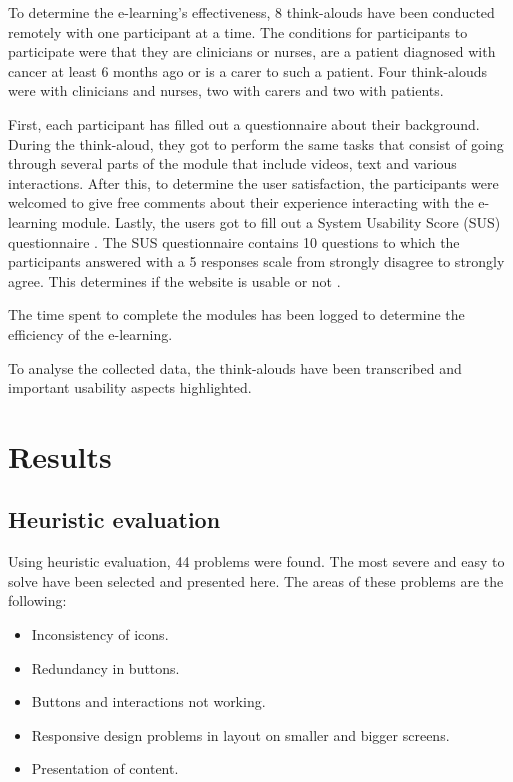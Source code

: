 \documentclass{sigchi}
\begin{document}
To determine the e-learning's effectiveness, 8 think-alouds have been conducted remotely with one participant at a time. The conditions for participants to participate were that they are clinicians or nurses, are a patient diagnosed with cancer at least 6 months ago or is a carer to such a patient. Four think-alouds were with clinicians and nurses, two with carers and two with patients.

First, each participant has filled out a questionnaire about their background. During the think-aloud, they got to perform the same tasks that consist of going through several parts of the module that include videos, text and various interactions. After this, to determine the user satisfaction, the participants were welcomed to give free comments about their experience interacting with the e-learning module. Lastly, the users got to fill out a System Usability Score (SUS) questionnaire \cite{brooke1996sus}. The SUS questionnaire contains 10 questions to which the participants answered with a 5 responses scale from strongly disagree to strongly agree. This determines if the website is usable or not \cite{brooke1996sus}.

The time spent to complete the modules has been logged to determine the efficiency of the e-learning. 

To analyse the collected data, the think-alouds have been transcribed and important usability aspects highlighted. 


\section{Results}

\subsection{Heuristic evaluation}
Using heuristic evaluation, 44 problems were found. The most severe and easy to solve have been selected and presented here. The areas of these problems are the following:

\begin{itemize}[noitemsep]
    \item Inconsistency of icons.
    \item Redundancy in buttons.
    \item Buttons and interactions not working.
    \item Responsive design problems in layout on smaller and bigger screens.
    \item Presentation of content.
\end{itemize}
\end{document}

